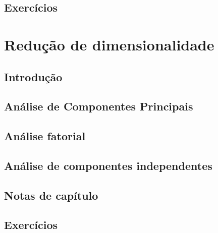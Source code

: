 \documentclass[
]{latex/krantz}
\theoremstyle{definition}
\theoremstyle{definition}
\theoremstyle{definition}
\theoremstyle{definition}
\theoremstyle{remark}
\begin{document}
\hypertarget{exercuxedcios-11}{%
\section{Exercícios}\label{exercuxedcios-11}}

\hypertarget{reduuxe7uxe3o-de-dimensionalidade}{%
\chapter{Redução de dimensionalidade}\label{reduuxe7uxe3o-de-dimensionalidade}}

\hypertarget{introduuxe7uxe3o-12}{%
\section{Introdução}\label{introduuxe7uxe3o-12}}

\hypertarget{anuxe1lise-de-componentes-principais}{%
\section{Análise de Componentes Principais}\label{anuxe1lise-de-componentes-principais}}

\hypertarget{anuxe1lise-fatorial}{%
\section{Análise fatorial}\label{anuxe1lise-fatorial}}

\hypertarget{anuxe1lise-de-componentes-independentes}{%
\section{Análise de componentes independentes}\label{anuxe1lise-de-componentes-independentes}}

\hypertarget{notas-de-capuxedtulo-12}{%
\section{Notas de capítulo}\label{notas-de-capuxedtulo-12}}

\hypertarget{exercuxedcios-12}{%
\section{Exercícios}\label{exercuxedcios-12}}

\hypertarget{appendix-apuxeandices}{%
\appendix {}}
\end{document}
